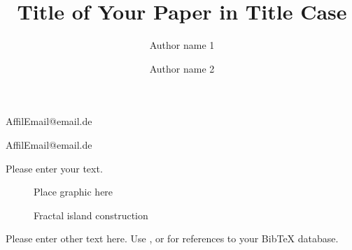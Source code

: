 \documentclass[a4paper,12pt]{article}
\begin{document}
\title{Title of Your Paper in Title Case}
\author{Author name 1}{Affil}{Email@email.de}
\author{Author name 2}{Affil}{Email@email.de}
\maketitle


Please enter your text.
\begin{figure}
Place graphic here
\caption{Fractal island construction}
\label{fig:fractal_island_construction}
\end{figure}

Please enter other text here. Use \parencite{key}, \cite{key} or \textcite{key} for references to your BibTeX database.

\printbibliography
\end{document}
